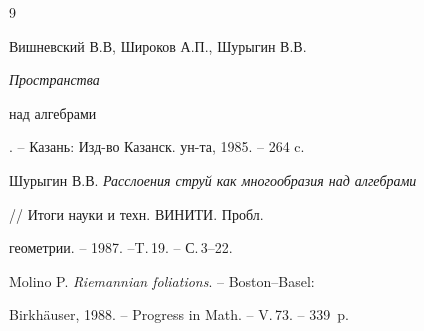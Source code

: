 \begin{thebibliography}{9}







Вишневский В.В, Широков А.П., Шурыгин В.В. {\em Пространства


над алгебрами}. -- Казань: Изд-во Казанск. ун-та, 1985. -- 264 c.




Шурыгин В.В. {\em Расслоения струй как многообразия над алгебрами}


// Итоги науки и техн. ВИНИТИ. Пробл.


геометрии. -- 1987. --T.\,19. -- С.\,3--22.




Molino P. {\em Riemannian foliations}. -- Boston--Basel:


Birkh\"auser, 1988. -- Progress in Math. -- V.\,73. -- 339~p.





\end{thebibliography}





\vskip 2cm












\label{end}





